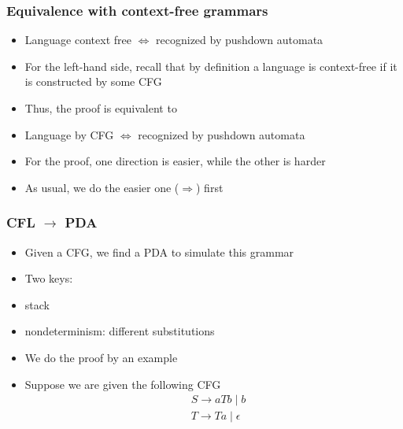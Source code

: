 




\begin{frame}[allowframebreaks] \frametitle{Equivalence with context-free grammars}
  \begin{itemize}  
\item  Language context free
$\Leftrightarrow$ recognized by pushdown automata

\item For the left-hand side, recall that by definition a language is context-free if
  it is constructed by some CFG
\item Thus, the proof is equivalent to 
\item []
  Language by CFG
$\Leftrightarrow$ recognized by pushdown automata
\item For the proof, one direction is easier, while the other is harder
\item As usual, we do the easier one ($\Rightarrow$) first
  
\end{itemize}\end{frame} \begin{frame}[allowframebreaks] \frametitle{CFL $\rightarrow$ PDA}
    \begin{itemize}
    \item Given a CFG, we find a PDA to simulate this grammar
      
\item Two keys:

\item [] stack 

\item [] nondeterminism: different substitutions

  
\item We do the proof by an example
\item Suppose we are given the following
  CFG
  \begin{equation*}
    \begin{split}
      & S \rightarrow aTb \mid b\\
      & T \rightarrow Ta \mid \epsilon
    \end{split}
  \end{equation*}


\end{itemize}
\end{frame}

